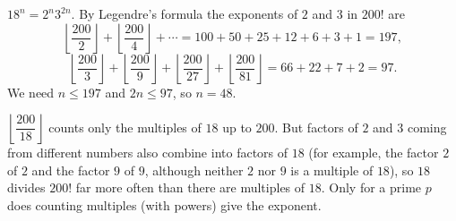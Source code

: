 $18^n=2^n3^{2n}$. By Legendre's formula the exponents of $2$ and $3$ in $200!$ are
\[\left\lfloor\dfrac{200}{2}\right\rfloor+\left\lfloor\dfrac{200}{4}\right\rfloor+\cdots=100+50+25+12+6+3+1=197,\]
\[\left\lfloor\dfrac{200}{3}\right\rfloor+\left\lfloor\dfrac{200}{9}\right\rfloor+\left\lfloor\dfrac{200}{27}\right\rfloor+\left\lfloor\dfrac{200}{81}\right\rfloor=66+22+7+2=97.\]
We need $n\le197$ and $2n\le97$, so $n=\boxed{48}$.

$\left\lfloor\dfrac{200}{18}\right\rfloor$ counts only the multiples of $18$ up to $200$. But factors of $2$ and $3$ coming from different numbers also combine into factors of $18$ (for example, the factor $2$ of $2$ and the factor $9$ of $9$, although neither $2$ nor $9$ is a multiple of $18$), so $18$ divides $200!$ far more often than there are multiples of $18$. Only for a prime $p$ does counting multiples (with powers) give the exponent.
